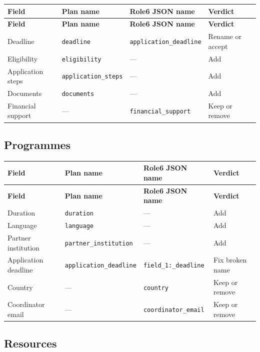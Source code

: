\documentclass[12pt,a4paper]{article}
\begin{document}
\begin{longtable}{@{}p{3.5cm}p{3.5cm}p{3.5cm}p{1.8cm}@{}}
\toprule
\rowcolor{uvtLightBlue}
\textbf{Field} & \textbf{Plan name} & \textbf{Role6 JSON name} & \textbf{Verdict} \\
\midrule
\endfirsthead
\toprule
\rowcolor{uvtLightBlue}
\textbf{Field} & \textbf{Plan name} & \textbf{Role6 JSON name} & \textbf{Verdict} \\
\midrule
\endhead
\bottomrule
\endfoot
Deadline & \texttt{deadline} & \texttt{application\_deadline} & Rename or accept \\
Eligibility & \texttt{eligibility} & --- & Add \\
Application steps & \texttt{application\_steps} & --- & Add \\
Documents & \texttt{documents} & --- & Add \\
Financial support & --- & \texttt{financial\_support} & Keep or remove \\
\end{longtable}

\subsection{Programmes}

\begin{longtable}{@{}p{3.5cm}p{3.5cm}p{3.5cm}p{1.8cm}@{}}
\toprule
\rowcolor{uvtLightBlue}
\textbf{Field} & \textbf{Plan name} & \textbf{Role6 JSON name} & \textbf{Verdict} \\
\midrule
\endfirsthead
\toprule
\rowcolor{uvtLightBlue}
\textbf{Field} & \textbf{Plan name} & \textbf{Role6 JSON name} & \textbf{Verdict} \\
\midrule
\endhead
\bottomrule
\endfoot
Duration & \texttt{duration} & --- & Add \\
Language & \texttt{language} & --- & Add \\
Partner institution & \texttt{partner\_institution} & --- & Add \\
Application deadline & \texttt{application\_deadline} & \texttt{field\_1:\_deadline} & Fix broken name \\
Country & --- & \texttt{country} & Keep or remove \\
Coordinator email & --- & \texttt{coordinator\_email} & Keep or remove \\
\end{longtable}

\subsection{Resources}
\end{document}
